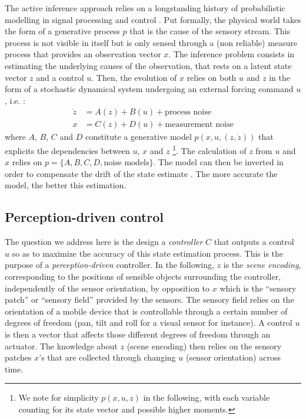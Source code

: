 \documentclass[12pt,twoside,openright]{article}
\begin{document}
	The active inference approach relies on a longstanding history of probabilistic modelling in signal processing and control \cite{Kalman1960,Baum1966,friston1994statistical}.  Put formally, the physical world  takes the form of a generative process $p$ that is the cause of the sensory stream. This process is not visible in itself but is only sensed through a (non reliable) measure process that provides an observation vector $x$. The inference problem consists in estimating the underlying causes of the observation, that rests on a latent state vector $z$ and a control $u$.  Then, the evolution of $x$ relies on both $u$ and $z$ in the form of a stochastic dynamical system undergoing an external forcing command $u$, i.e. :
	\begin{align}
	  \dot{z} &= A(z) + B(u) + \text{process noise}\label{eq:kalman-process}\\
	  x &= C(z) + D(u) + \text{measurement noise} \label{eq:kalman-measure}
	\end{align}  
	where $A$, $B$, $C$ and $D$ constitute a generative model $p(x,u,(z,\dot{z}))$ that explicits the dependencies between $u$, $x$ and $z$ \footnote{We note for simplicity $p(x,u,z)$ in the following, with each variable counting for its state vector and possible higher moments.}. 
	The calculation of $z$ from $u$ and $x$ relies on $p = \{A,B,C,D,\text{noise models}\}$. The model can then be inverted in order to compensate the drift of the state estimate \cite{Kalman1960,Baum1966}. The more accurate the model, the better this estimation. 
	
	\subsection{Perception-driven control}
	The question we address here is the design a \emph{controller} $C$ that outputs a control $u$ so as to maximize the accuracy of this state estimation process. This is the purpose of a \emph{perception-driven} controller.
	{\color{magenta} In the following, $z$ is the \emph{scene encoding}, corresponding to the positions of sensible objects surrounding the controller, independently of the sensor orientation}, by opposition to $x$ which is the ``sensory patch'' or ``sensory field'' provided by the sensors. {\color{blue} The sensory field relies on the orientation of a mobile device that is controllable through a certain number of degrees of freedom (pan, tilt and roll for a visual sensor for instance). A control $u$ is then a vector that affects those different degrees of freedom through an actuator.} The knowledge about $z$ (scene encoding) then relies on the sensory patches $x$'s that are collected through changing $u$ (sensor orientation) across time. 
	
\end{document}
